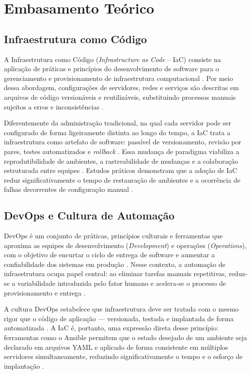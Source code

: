 \documentclass[12pt]{article}
\begin{document}
\section{Embasamento Teórico}
\subsection{Infraestrutura como Código}

A Infraestrutura como Código (\textit{Infrastructure as Code} -- IaC)
consiste na aplicação de práticas e princípios do desenvolvimento de
software para o gerenciamento e provisionamento de infraestrutura
computacional \cite{morris2016}. Por meio dessa abordagem, configurações
de servidores, redes e serviços são descritas em arquivos de código
versionáveis e reutilizáveis, substituindo processos manuais sujeitos
a erros e inconsistências \cite{redhat2022}.

Diferentemente da administração tradicional, na qual cada servidor pode
ser configurado de forma ligeiramente distinta ao longo do tempo, a IaC
trata a infraestrutura como artefato de software: passível de
versionamento, revisão por pares, testes automatizados e \textit{rollback}
\cite{morris2016}. Essa mudança de paradigma viabiliza a reprodutibilidade
de ambientes, a rastreabilidade de mudanças e a colaboração estruturada
entre equipes \cite{ufu2019}. Estudos práticos demonstram que a adoção de
IaC reduz significativamente o tempo de restauração de ambientes e a
ocorrência de falhas decorrentes de configuração manual \cite{pucminas}.


\subsection{DevOps e Cultura de Automação}

DevOps é um conjunto de práticas, princípios culturais e ferramentas que aproxima as equipes de desenvolvimento (\textit{Development}) e operações (\textit{Operations}), com o objetivo de encurtar o ciclo de entrega de software e aumentar a confiabilidade dos sistemas em produção \cite{kim2018}. Nesse contexto, a automação de infraestrutura ocupa papel central: ao eliminar tarefas manuais repetitivas, reduz-se a variabilidade introduzida pelo fator humano e acelera-se o processo de provisionamento e entrega \cite{zenodo_devops}.

A cultura DevOps estabelece que infraestrutura deve ser tratada com o
mesmo rigor que o código de aplicação — versionada, testada e implantada
de forma automatizada \cite{kim2018}. A IaC é, portanto, uma expressão
direta desse princípio: ferramentas como o Ansible permitem que o estado
desejado de um ambiente seja declarado em arquivos YAML e aplicado de
forma consistente em múltiplos servidores simultaneamente, reduzindo
significativamente o tempo e o esforço de implantação \cite{redhat2022}.
\end{document}
